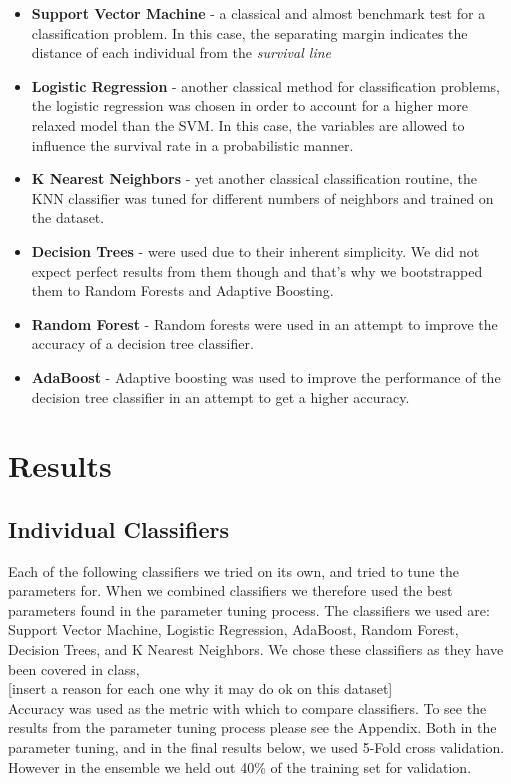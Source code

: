 \documentclass{article}
\begin{document}
\begin{itemize}
\item \textbf{Support Vector Machine} - a classical and almost benchmark test for a classification problem. In this case, the separating margin indicates the distance of each individual from the \textit{survival line}
\item \textbf{Logistic Regression} - another classical method for classification problems, the logistic regression was chosen in order to account for a higher more relaxed model than the SVM. In this case, the variables are allowed to influence the survival rate in a probabilistic manner.
\item \textbf{K Nearest Neighbors} - yet another classical classification routine, the KNN classifier was tuned for different numbers of neighbors and trained on the dataset.
\item \textbf{Decision Trees} - were used due to their inherent simplicity. We did not expect perfect results from them though and that's why we bootstrapped them to Random Forests and Adaptive Boosting.
\item \textbf{Random Forest} - Random forests were used in an attempt to improve the accuracy of a decision tree classifier. 
\item \textbf{AdaBoost} - Adaptive boosting was used to improve the performance of the decision tree classifier in an attempt to get a higher accuracy.
\end{itemize}


\section{Results}
\label{sec:res}
\subsection{Individual Classifiers}
Each of the following classifiers we tried on its own, and tried to tune the parameters for. When we combined classifiers we therefore used the best parameters found in the parameter tuning process. The classifiers we used are: Support Vector Machine, Logistic Regression, AdaBoost, Random Forest, Decision Trees, and K Nearest Neighbors. We chose these classifiers as they have been covered in class, \\

[insert a reason for each one why it may do ok on this dataset]  \\

Accuracy was used as the metric with which to compare classifiers. To see the results from the parameter tuning process please see the Appendix. Both in the parameter tuning, and in the final results below, we used 5-Fold cross validation. However in the ensemble we held out 40\% of the training set for validation.\\
\end{document}
